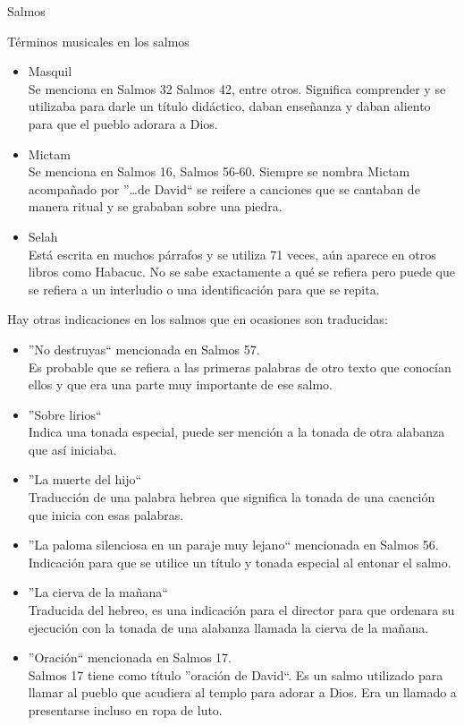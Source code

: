 \begin{section}{Salmos}
\begin{subsection}{Términos musicales en los salmos}
\begin{itemize}
			\item Masquil\\
				Se menciona en Salmos 32 Salmos 42, entre otros. Significa comprender y se utilizaba para darle un título didáctico, daban enseñanza y daban aliento para que el pueblo adorara a Dios.
			\item Mictam\\
				Se menciona en Salmos 16, Salmos 56-60. Siempre se nombra Mictam acompañado por ''\ldots de David`` se reifere a canciones que se cantaban de manera ritual y se grababan sobre una piedra.
			\item Selah\\
				Está escrita en muchos párrafos y se utiliza 71 veces, aún aparece en otros libros como Habacuc. No se sabe exactamente a qué se refiera pero puede que se refiera a un interludio o una identificación para que se repita.
		\end{itemize}
		Hay otras indicaciones en los salmos que en ocasiones son traducidas:
		\begin{itemize}
			\item ''No destruyas`` mencionada en Salmos 57.\\
				Es probable que se refiera a las primeras palabras de otro texto que conocían ellos y que era una parte muy importante de ese salmo. 
			\item ''Sobre lirios``\\
				Indica una tonada especial, puede ser mención a la tonada de otra alabanza que así iniciaba.
			\item ''La muerte del hijo``\\
				Traducción de una palabra hebrea que significa la tonada de una cacnción que inicia con esas palabras.
			\item ''La paloma silenciosa en un paraje muy lejano`` mencionada en Salmos 56.\\
				Indicación para que se utilice un título y tonada especial al entonar el salmo.
			\item ''La cierva de la mañana``\\
				Traducida del hebreo, es una indicación para el director para que ordenara su ejecución con la tonada de una alabanza llamada la cierva de la mañana.
			\item ''Oración`` mencionada en Salmos 17.\\
				Salmos 17 tiene como título ''oración de David``. Es un salmo utilizado para llamar al pueblo que acudiera al templo para adorar a Dios. Era un llamado a presentarse incluso en ropa de luto.

\end{itemize}
\end{subsection}
\end{section}
